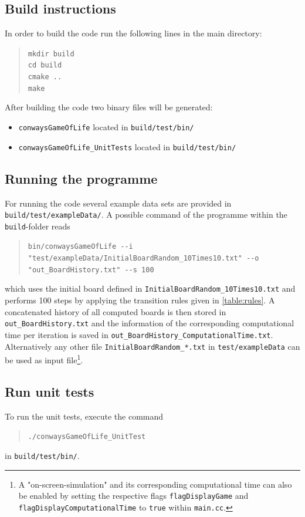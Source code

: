 \subsection{Build instructions}
In order to build the code run the following lines in the main directory:
\begin{quote}
	\texttt{mkdir build}\\
	\texttt{cd build}\\
	\texttt{cmake ..}\\
	\texttt{make}
\end{quote}


After building the code two binary files will be generated:
\begin{itemize}
	\item \texttt{conwaysGameOfLife} located in \texttt{build/test/bin/}
	\item \texttt{conwaysGameOfLife\_UnitTests} located in \texttt{build/test/bin/}
\end{itemize}


\subsection{Running the programme}
For running the code several example data sets are provided in \texttt{build/test/exampleData/}.
A possible command of the programme within the \texttt{build}-folder reads
\begin{quote}
	\texttt{bin/conwaysGameOfLife -{}-i "test/exampleData/InitialBoardRandom\_10Times10.txt" -{}-o "out\_BoardHistory.txt" -{}-s 100}
\end{quote}
which uses the initial board defined in \texttt{InitialBoardRandom\_10Times10.txt} and performs 100 steps by applying the transition rules given in \cref{table:rules}. A concatenated history of all computed boards is then stored in \texttt{out\_BoardHistory.txt} and the information of the corresponding computational time per iteration is saved in \texttt{out\_BoardHistory\_ComputationalTime.txt}.
Alternatively any other file \texttt{InitialBoardRandom\_*.txt} in \texttt{test/exampleData} can be used as input file\footnote{A "on-screen-simulation" and its corresponding computational time can also be enabled by setting the respective flags \texttt{flagDisplayGame} and \texttt{flagDisplayComputationalTime} to \texttt{true} within \texttt{main.cc}.}.

\subsection{Run unit tests}
To run the unit tests, execute the command
\begin{quote}
	\texttt{./conwaysGameOfLife\_UnitTest}
\end{quote}
in \texttt{build/test/bin/}.



